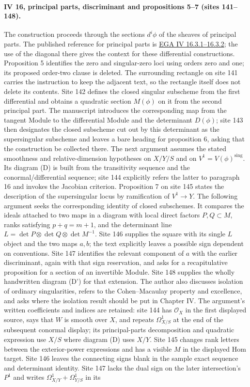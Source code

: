 \paragraph{IV 16, principal parts, discriminant and propositions 5--7 (sites 141--148).}
The construction proceeds through the sections $d^i\phi$ of the sheaves of principal parts. The published reference for principal parts is \href{https://www.numdam.org/articles/10.1007/BF02732123/}{EGA IV 16.3.1--16.3.2}; the use of the diagonal there gives the context for these differential constructions. Proposition 5 identifies the zero and singular-zero loci using orders zero and one; its proposed order-two clause is deleted. The surrounding rectangle on site 141 carries the instruction to keep the adjacent text, so the rectangle itself does not delete its contents. Site 142 defines the closed singular subscheme from the first differential and obtains a quadratic section $M(\phi)$ on it from the second principal part. The manuscript introduces the corresponding map from the tangent Module to the differential Module and the determinant $D(\phi)$; site 143 then designates the closed subscheme cut out by this determinant as the supersingular subscheme and leaves a bare heading for proposition 6, asking that the construction be collected there. The next argument assumes the stated smoothness and relative-dimension hypotheses on $X/Y/S$ and on $V^1=V(\phi)^{\mathrm{sing}}$. Its diagram (D) is built from the transitivity sequence and the conormal/differential sequence; site 144 explicitly refers the latter to paragraph 16 and invokes the Jacobian criterion. Proposition 7 on site 145 states the description of the supersingular locus by ramification of $V^1\longrightarrow Y$. The following argument seeks the corresponding identity of closed subschemes. It compares the ideals attached to two maps in a diagram with local direct factors $P,Q\subset M$, ranks satisfying $p+q=m+1$, and the determinant line $L=\det P\otimes\det Q\otimes\det M^{-1}$. Site 146 supplies the square with its single $L$ object and the two maps $a,b$; the text explicitly leaves a possible sign dependent on conventions. Site 147 identifies the relevant component of $a$ with the earlier discriminant, again with that sign reservation, and asks for a recapitulative proposition for a section of an invertible Module. Site 148 supplies the wholly handwritten diagram (D') for that extension. The author also discusses isolation of ordinary singularities, refers to the Cohen--Macaulay property and excellence, and asks where the isolation result should be put in Chapter IV. The argument's written coefficients and indices are retained: site 144 has $\mathcal O_X$ in the first displayed source, says that $W$ is smooth over $X$, and repeats $\Omega^1_{X/S}$ at the end of the subsequent conormal display; its principal-parts decomposition and quadratic expression use $X/S$ where diagram (D) uses $X/Y$. Site 145 changes rank letters between the exterior-power expressions and has a visible $M$ in the displayed Hom target. Site 146 leaves the connecting signs blank in the sample exact sequence and determinant identity. Site 147 lacks the dual sign on the later intersection's $P^1$ and writes $\Omega^1_{X/Y}+\Omega^1_{Y/S}$ in its 